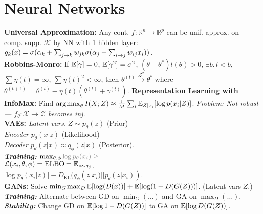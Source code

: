 \section*{Neural Networks}
\textbf{Universal Approximation:} Any cont. $f:\mathbb{R}^n\to\mathbb{R}^p$ can be unif. approx. on comp. supp. $\mathcal{K}$ by NN with 1 hidden layer: $g_k(x)=\sigma(\alpha_k+\sum_{j\to k}w_{jk}\sigma(\alpha_j+\sum_{i\to j} w_{ij}x_i))$.\\
\textbf{Robbins-Monro:} If $\mathbb{E}[\gamma]=0$, $\mathbb{E}[\gamma^2]=\sigma^2$, $(\theta-\theta^*)l(\theta) > 0$, $\exists b.\,l<b$, $\sum\eta(t) = \infty$, $\sum\eta(t)^2 < \infty$, then
$\theta^{(t)}\overset{\mathcal{L}^2}{\to}\theta^*$ where
$\theta^{(t+1)} = \theta^{(t)} - \eta(t)(\theta^{(t)}+\gamma^{(t)})$.
\textbf{Representation Learning with InfoMax:} Find $\operatorname*{arg\,max}_\theta I(X;Z) \approx \frac{1}{M}\sum_i\mathbb{E}_{Z|x_i}[\log p(x_i|Z)]$. \emph{Problem: Not robust --- $f_\theta:\mathcal{X}\to\mathcal{Z}$ becomes inj.}\\
\textbf{VAEs:} \emph{Latent vars.} $Z\sim p_\theta(z)$ (Prior)\\
\emph{Encoder} $p_\theta(x|z)$ (Likelihood)\\
\emph{Decoder} $p_\theta(z|x)\approx q_\phi(z|x)$ (Posterior).\\
\emph{\textbf{Training:}} $\max_{\theta,\phi} {\color{gray}\log p_\theta(x_i) \geq}$\\$ \mathcal{L}(x_i,\theta,\phi) = \mathrm{ELBO} = \mathbb{E}_{z\sim q_\phi}[$\\$\log p_\theta(x_i|z)] - D_{\mathrm{KL}}(q_\phi(z|x_i)||p_\theta(z|x_i))$.\\
\textbf{GANs:} Solve $\min_G\max_D\mathbb{E}[\log(D(x))] + \mathbb{E}[\log(1-D(G(Z)))]$. (Latent vars $Z$.)\\
\emph{\textbf{Training:}} Alternate between GD on $\min_G(\dots)$ and GA on $\max_D(\ldots)$.\\
\emph{\textbf{Stability:}} Change GD on $\mathbb{E}[\log 1-D(G(Z))]$ to GA on $\mathbb{E}[\log D(G(Z))]$.
